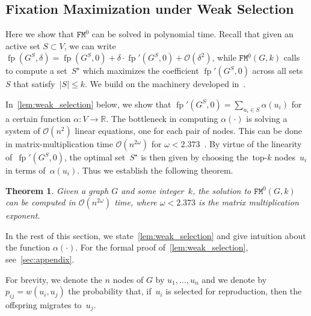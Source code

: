 \documentclass[letterpaper]{article}
\def\bigO{\mathcal{O}}
\def\R{\mathbb{R}}
\def\dfp{\fp'(G^S,0)}
\newtheorem{theorem}{Theorem}
\newcommand{\fp}{\operatorname{fp}}
\newcommand{\NodeActivationMoranWeak}{\texttt{FM}^{0}}
\newcommand{\FitAdv}{\delta}
\newcommand{\Weight}{w}
\begin{document}
\subsection{Fixation Maximization under Weak Selection}\label{subsec:positive_weak}

Here we show that $\NodeActivationMoranWeak$ can be solved in polynomial time.
Recall that given an active set $S\subset V$, we can write $\fp(G^S,\FitAdv)=\fp(G^S,0)+\FitAdv\cdot \dfp + \bigO(\FitAdv^2)$, while $\NodeActivationMoranWeak(G,k)$ calls to compute a set~$S^\star$ which maximizes the coefficient $\dfp$ across all sets~$S$ that satisfy~$|S|\le k$. We build on the machinery developed in~\cite{Allen2017}.


In~\cref{lem:weak_selection} below, we show that $\fp'(G^S,0)=\sum_{u_i\in S} \alpha(u_i)$
for a certain function $\alpha\colon V\to\R$.
The bottleneck in computing $\alpha(\cdot)$ is
solving a system of
$\bigO(n^2)$
linear equations,
one for each pair of nodes.
This can be done in matrix-multiplication time %
$\bigO(n^{2\omega})$
for $\omega<2.373$~\cite{Alman2021}.
By virtue of the linearity of~$\fp'(G^S,0)$, the optimal set~$S^\star$ is then given by
choosing the~top-$k$ nodes~$u_i$ in terms of~$\alpha(u_i)$.
Thus we establish the following theorem.

\begin{theorem}\label{thm:weak_selection}
Given a graph $G$ and some integer~$k$, the solution to $\NodeActivationMoranWeak(G,k)$ can be computed in
$\bigO(n^{2\omega})$
time, where $\omega<2.373$ is the matrix multiplication exponent.
\end{theorem}

In the rest of this section, we state~\cref{lem:weak_selection}
and give intuition about the function $\alpha(\cdot)$.
For the formal proof of~\cref{lem:weak_selection}, see~\cref{sec:appendix}. %

For brevity, we denote the $n$ nodes of $G$ by $u_1,\dots,u_n$
and we denote by~$p_{ij}=\Weight(u_i, u_j)$ the probability that,
if~$u_i$ is selected for reproduction, then the offspring migrates to~$u_j$.
\end{document}
